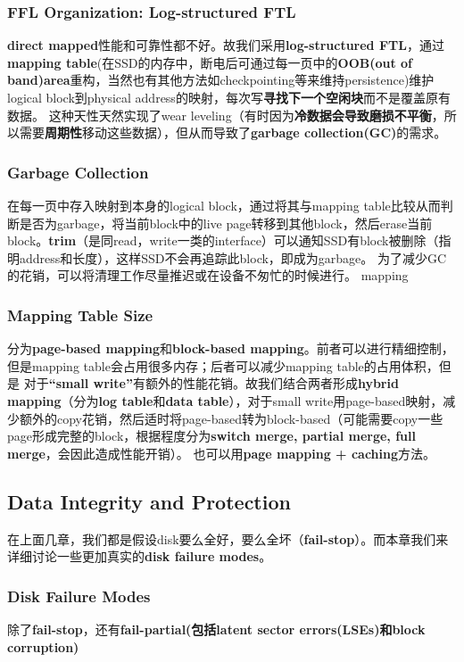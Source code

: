 \documentclass{article}
\begin{document}
\subsubsection{FFL Organization: Log-structured FTL}
\textbf{direct mapped}性能和可靠性都不好。故我们采用\textbf{log-structured FTL}，通过\textbf{mapping table}(在SSD的内存中，断电后可通过每一页中的\textbf{OOB(out of band)area}重构，当然也有其他方法如checkpointing等来维持persistence)维护logical block到physical address的映射，每次写\textbf{寻找下一个空闲块}而不是覆盖原有数据。
这种天性天然实现了wear leveling（有时因为\textbf{冷数据会导致磨损不平衡}，所以需要\textbf{周期性}移动这些数据），但从而导致了\textbf{garbage collection(GC)}的需求。
\subsubsection{Garbage Collection}
在每一页中存入映射到本身的logical block，通过将其与mapping table比较从而判断是否为garbage，将当前block中的live page转移到其他block，然后erase当前block。\textbf{trim}（是同read，write一类的interface）可以通知SSD有block被删除（指明address和长度），这样SSD不会再追踪此block，即成为garbage。
为了减少GC的花销，可以将清理工作尽量推迟或在设备不匆忙的时候进行。
mapping\subsubsection{Mapping Table Size}
分为\textbf{page-based mapping}和\textbf{block-based mapping}。前者可以进行精细控制，但是mapping table会占用很多内存；后者可以减少mapping table的占用体积，但是
对于\textbf{“small write”}有额外的性能花销。故我们结合两者形成\textbf{hybrid mapping}（分为\textbf{log table}和\textbf{data table}），对于small write用page-based映射，减少额外的copy花销，然后适时将page-based转为block-based（可能需要copy一些page形成完整的block，根据程度分为\textbf{switch merge, partial merge, full merge}，会因此造成性能开销）。
也可以用\textbf{page mapping + caching}方法。
\subsection{Data Integrity and Protection}
在上面几章，我们都是假设disk要么全好，要么全坏（\textbf{fail-stop}）。而本章我们来详细讨论一些更加真实的\textbf{disk failure modes}。
\subsubsection{Disk Failure Modes}
除了\textbf{fail-stop}，还有\textbf{fail-partial(包括latent sector errors(LSEs)和block corruption)}
\end{document}
